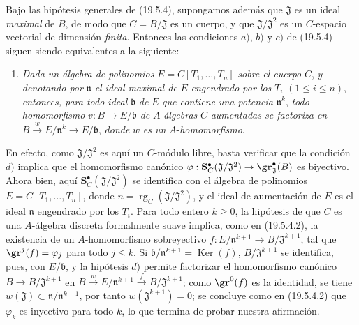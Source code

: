 \begin{remark}[19.5.5]
\label{0.19.5.5-fr}
Bajo las hipótesis generales de (19.5.4), supongamos además que
$\mathfrak J$ es un ideal \emph{maximal} de $B$, de modo que
$C=B/\mathfrak J$ es un cuerpo, y que $\mathfrak J/\mathfrak J^2$ es un
$C$-espacio vectorial de dimensión \emph{finita}. Entonces las condiciones $a)$,
$b)$ y $c)$ de (19.5.4) siguen siendo equivalentes a la siguiente:
\begin{enumerate}
  \item[d)] \emph{Dada un álgebra de polinomios}
  $E=C[T_1,\ldots,T_n]$ \emph{sobre el cuerpo} $C$, \emph{y denotando por}
  $\mathfrak n$ \emph{el ideal maximal de} $E$ \emph{engendrado por los} $T_i$
  $(1\leq i\leq n)$, \emph{entonces, para todo ideal} $\mathfrak b$ \emph{de}
  $E$ \emph{que contiene una potencia} $\mathfrak n^k$, \emph{todo
  homomorfismo} $v:B\to E/\mathfrak b$ \emph{de} $A$-\emph{álgebras}
  $C$-\emph{aumentadas se factoriza en}
  $B\xrightarrow{w}E/\mathfrak n^k\to E/\mathfrak b$, \emph{donde} $w$ \emph{es
  un} $A$-\emph{homomorfismo}.
\end{enumerate}
En efecto, como $\mathfrak J/\mathfrak J^2$ es aquí un $C$-módulo libre, basta
verificar que la condición $d)$ implica que el homomorfismo canónico
$\varphi:\mathbf S_C^\bullet(\mathfrak J/\mathfrak J^2)\to\gr_{\mathfrak J}^\bullet(B)$
es biyectivo. Ahora bien, aquí $\mathbf S_C^\bullet(\mathfrak J/\mathfrak J^2)$ se identifica con
el álgebra de polinomios $E=C[T_1,\ldots,T_n]$, donde
$n=\operatorname{rg}_C(\mathfrak J/\mathfrak J^2)$, y el ideal de aumentación
de $E$ es el ideal $\mathfrak n$ engendrado por los $T_i$. Para todo entero
$k\geq0$, la hipótesis de que $C$ es una $A$-álgebra discreta formalmente suave
implica, como en (19.5.4.2), la existencia de un $A$-homomorfismo sobreyectivo
$f:E/\mathfrak n^{k+1}\to B/\mathfrak J^{k+1}$, tal que
$\gr^j(f)=\varphi_j$ para todo $j\leq k$. Si
$\mathfrak b/\mathfrak n^{k+1}=\operatorname{Ker}(f)$,
$B/\mathfrak J^{k+1}$ se identifica, pues, con $E/\mathfrak b$, y la hipótesis $d)$
permite factorizar el homomorfismo canónico $B\to B/\mathfrak J^{k+1}$ en
$B\xrightarrow{w}E/\mathfrak n^{k+1}\xrightarrow{f}B/\mathfrak J^{k+1}$;
como $\gr^0(f)$ es la identidad, se tiene
$w(\mathfrak J)\subset\mathfrak n/\mathfrak n^{k+1}$, por tanto
$w(\mathfrak J^{k+1})=0$; se concluye como en (19.5.4.2) que $\varphi_k$
es inyectivo para todo $k$, lo que termina de probar nuestra afirmación.
\end{remark}

